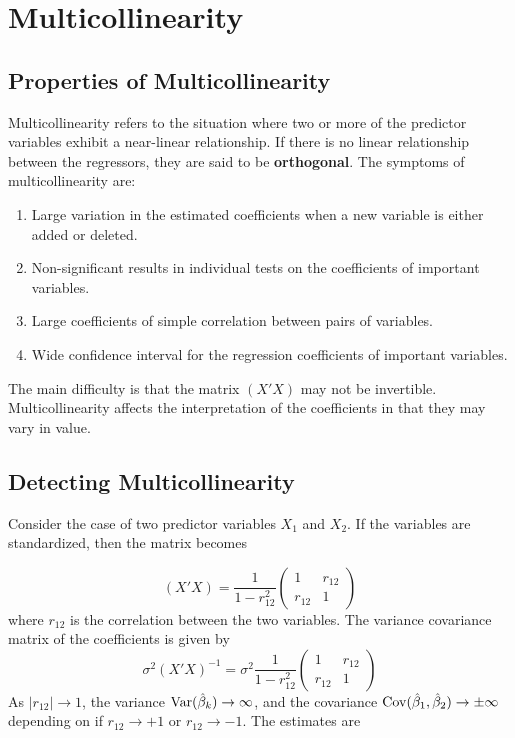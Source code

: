 \chapter{Multicollinearity}

\section{Properties of Multicollinearity}
Multicollinearity refers to the situation where two or more of the predictor variables exhibit a near-linear relationship. If there is no linear relationship between the regressors, they are said to be \textbf{orthogonal}. The symptoms of multicollinearity are:

\begin{enumerate}
    \item Large variation in the estimated coefficients when a new variable is either added or deleted.
    \item Non-significant results in individual tests on the coefficients of important variables.
    \item Large coefficients of simple correlation between pairs of variables. 
    \item Wide confidence interval for the regression coefficients of important variables.
\end{enumerate}

The main difficulty is that the matrix $(X'X)$ may not be invertible. Multicollinearity affects the interpretation of the coefficients in that they may vary in value. 

\section{Detecting Multicollinearity}
Consider the case of two predictor variables $X_1$ and $X_2$. If the variables are standardized, then the matrix becomes 

\[(X'X) = \frac{1}{1-r_{12}^2}\begin{pmatrix}
    1 & r_{12} \\
    r_{12} & 1
\end{pmatrix}\]
where $r_{12}$ is the correlation between the two variables. The variance covariance matrix of the coefficients is given by
\[\sigma^2(X'X)^{-1} = \sigma^2 \frac{1}{1-r_{12}^2}\begin{pmatrix}
    1 & r_{12} \\
    r_{12} & 1
\end{pmatrix}\]
As $|r_{12}| \rightarrow 1$, the variance $\operatorname{Var}(\hat{\beta}_k) \rightarrow \infty$, and the covariance $\operatorname{Cov}(\hat{\beta}_1, \hat{\beta}_2) \rightarrow \pm \infty$ depending on if $r_{12} \rightarrow +1$ or $r_{12} \rightarrow -1$. The estimates are 

